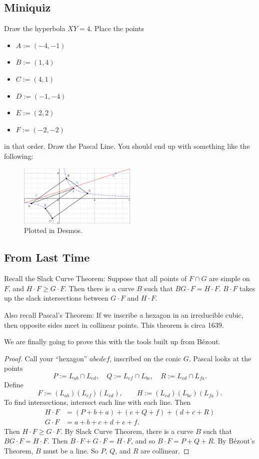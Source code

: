 \documentclass[12pt]{article}
\theoremstyle{definition}
\begin{document}
\subsection{Miniquiz}
Draw the hyperbola $XY=4$. Place the points
\begin{multicols}{3}
    \begin{itemize}
        \item $A:=(-4,-1)$
        \item $B:=(1,4)$
        \item $C:=(4,1)$
        \item $D:=(-1,-4)$
        \item $E:=(2,2)$
        \item $F:=(-2,-2)$
    \end{itemize}
\end{multicols}
in that order. Draw the Pascal Line. You should end up with something like the following:
\begin{figure}[H]
    \centering
    \includegraphics[width=0.5\textwidth]{48.png}
    \caption{Plotted in Desmos.}
\end{figure}
\subsection{From Last Time}
Recall the Slack Curve Theorem: Suppose that all points of $F\cap G$ are simple on $F$, and $H\cdot F\geq G\cdot F$. Then there is a curve $B$ such that $BG\cdot F=H\cdot F$. $B\cdot F$ takes up the slack intersections between $G\cdot F$ and $H\cdot F$.

Also recall Pascal's Theorem: If we inscribe a hexagon in an irreducible cubic, then opposite sides meet in collinear points. This theorem is circa 1639.

We are finally going to prove this with the tools built up from B\'ezout.
\begin{proof}
    Call your ``hexagon'' $abcdef$, inscribed on the conic $G$. Pascal looks at the points
    \[P:=L_{ab}\cap L_{ed},\quad Q:=L_{ef}\cap L_{bc},\quad R:=L_{cd}\cap L_{fa}.\]
    Define 
    \[F:=(L_{ab})(L_{ef})(L_{cd}),\qquad H:=(L_{ed})(L_{bc})(L_{fa}).\]
    To find intersections, intersect each line with each line. Then
    \begin{align*}
        H\cdot F&=(P+b+a)+(e+Q+f)+(d+c+R)\\
        G\cdot F&=a+b+c+d+e+f.
    \end{align*}
    Then $H\cdot F\geq G\cdot F$. By Slack Curve Theorem, there is a curve $B$ such that $BG\cdot F=H\cdot F$. Then $B\cdot F+G\cdot F=H\cdot F$, and so $B\cdot F=P+Q+R$. By B\'ezout's Theorem, $B$ must be a line. So $P$, $Q$, and $R$ are collinear.
\end{proof}
\end{document}
